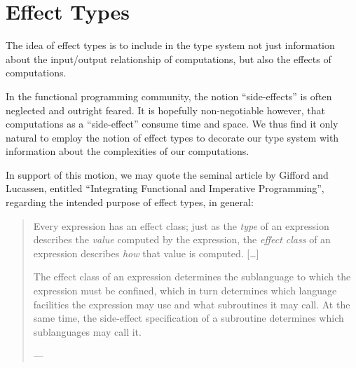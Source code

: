 \chapter{Effect Types}

The idea of effect types is to include in the type system not just information
about the input/output relationship of computations, but also the effects of
computations.

In the functional programming community, the notion ``side-effects'' is often
neglected and outright feared. It is hopefully non-negotiable however, that
computations as a ``side-effect'' consume time and space. We thus find it only
natural to employ the notion of effect types to decorate our type system with
information about the complexities of our computations.

In support of this motion, we may quote the seminal article by Gifford and
Lucassen, entitled ``Integrating Functional and Imperative Programming'',
regarding the intended purpose of effect types, in general:

\begin{quotation}

\footnotesize\sffamily\itshape

Every expression has an effect class; just as the \emph{type} of an expression
describes the \emph{value} computed by the expression, the \emph{effect class}
of an expression describes \emph{how} that value is computed. [\ldots]

The effect class of an expression determines the sublanguage to which the
expression must be confined, which in turn determines which language facilities
the expression may use and what subroutines it may call. At the same time, the
side-effect specification of a subroutine determines which sublanguages may
call it.

\begin{flushright}

\footnotesize\sffamily

--- \cite{gifford-lucassen-1986}

\end{flushright}

\end{quotation}
